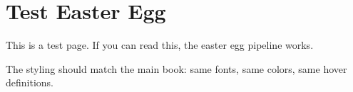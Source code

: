 \chapter*{Test Easter Egg}

This is a test page. If you can read this, the easter egg pipeline works.

The styling should match the main book: same fonts, same colors, same hover definitions.
